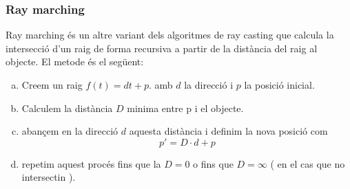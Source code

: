 \documentclass{article}
\begin{document}
\subsubsection{Ray marching}
Ray marching és un altre variant dels algoritmes de ray casting que calcula la intersecció d'un raig de forma recursiva a partir
de la distància del raig al objecte.
El metode és el següent:
\begin{enumerate}[a)]
   \item Creem un raig $f(t)= dt+p$. amb  $d$ la direcció i  $p $ la posició inicial.
    \item  Calculem la distància $D$ minima entre p i el objecte.
       \item abançem en la direcció $d$ aquesta distància i definim  la nova posició com
          \begin{equation*}
              p'=D\cdot d+p
          \end{equation*}
       \item repetim aquest procés fins que la $D=0$ o fins que  $D= \infty$ ( en el cas que no intersectin ).
\end{enumerate}
\end{document}
